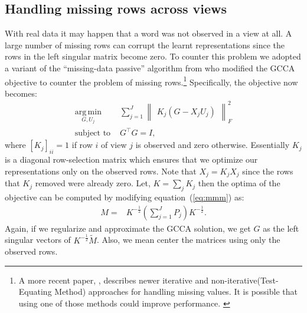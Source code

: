 \documentclass[11pt]{article}
\begin{document}
\subsection{Handling missing rows across views}
\label{ssec:missing}
With real data it may happen that a word was not observed in a view at
all. A large number of 
missing rows can corrupt the learnt representations since the rows
in the left singular matrix become zero.
To counter this problem we adopted a variant of the ``missing-data
passive'' algorithm from \cite{van2006generalized} who modified the
GCCA objective to counter the problem of missing 
rows.\footnote{A more recent paper, \cite{van2012generalized},
  describes newer iterative and non-iterative(Test-Equating Method)
  approaches for handling missing values. It is possible that using
  one of those methods could improve performance. \label{ftn:mis}}
Specifically, the objective now becomes:
\begin{equation}
  \label{eq:gcca2}
\begin{split}
  \operatorname*{arg\,min}_{G,U_j} & \sum_{j=1}^J \begin{Vmatrix} K_j(G - X_jU_j) \end{Vmatrix}^2_F \\
  \text{subject to } & G^\top G = I, 
\end{split}
\end{equation}
where $[K_j]_{ii} = 1$ if row $i$ of view $j$ is observed and zero otherwise. Essentially $K_j$ is a diagonal row-selection matrix which ensures
that we optimize our representations only on the observed rows. Note that
$X_j = K_jX_j$ since the rows that $K_j$ removed were already
zero. Let, $K =
\sum_j K_j$ then the optima
of the objective can be computed by modifying equation~(\ref{eq:mmm}) as:
\begin{align}
  M =& K^{-\frac{1}{2}}(\sum_{j=1}^J P_j)K^{-\frac{1}{2}}.
\end{align}
Again, if we regularize and approximate the GCCA solution, we get
$G$ as the left singular vectors of $K^{-\frac{1}{2}}\tilde{M}$. Also, we mean center the matrices using only the observed rows.
\end{document}
